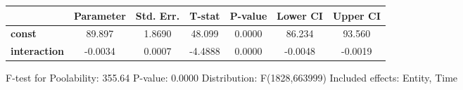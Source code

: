 \begin{center}
\begin{tabular}{lclc}
\end{tabular}
\begin{tabular}{lcccccc}
                     & \textbf{Parameter} & \textbf{Std. Err.} & \textbf{T-stat} & \textbf{P-value} & \textbf{Lower CI} & \textbf{Upper CI}  \\
\midrule
\textbf{const}       &       89.897       &       1.8690       &      48.099     &      0.0000      &       86.234      &       93.560       \\
\textbf{interaction} &      -0.0034       &       0.0007       &     -4.4888     &      0.0000      &      -0.0048      &      -0.0019       \\
\bottomrule
\end{tabular}
\end{center}

F-test for Poolability: 355.64 \newline
 P-value: 0.0000 \newline
 Distribution: F(1828,663999) \newline
  \newline
 Included effects: Entity, Time